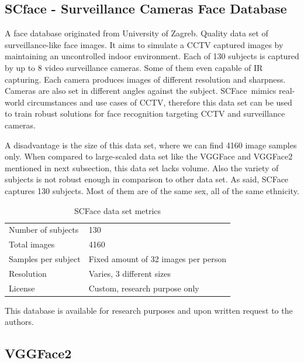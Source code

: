 \subsection{SCface - Surveillance Cameras Face Database}

A face database originated from University of Zagreb. Quality data set of surveillance-like face images. It aims to simulate a CCTV captured images by maintaining an uncontrolled indoor environment. Each of 130 subjects is captured by up to 8 video surveillance cameras. Some of them even capable of IR capturing. Each camera produces images of different resolution and sharpness. Cameras are also set in different angles against the subject. SCFace\,\cite{scface} mimics real-world circumstances and use cases of CCTV, therefore this data set can be used to train robust solutions for face recognition targeting CCTV and surveillance cameras.

A disadvantage is the size of this data set, where we can find \num{4160} image samples only. When compared to large-scaled data set like the VGGFace and VGGFace2 mentioned in next subsection, this data set lacks volume. Also the variety of subjects is not robust enough in comparison to other data set. As said, SCFace captures 130 subjects. Most of them are of the same sex, all of the same ethnicity.

\begin{table}[ht]
    \centering
    \caption{SCFace data set metrics}

    \begin{tabularx}{.8\textwidth}{l|X}
        \toprule
        Number of subjects & 130 \\
        Total images & \num{4160} \\
        Samples per subject & Fixed amount of 32 images per person \\
        Resolution & Varies, 3 different sizes \\
        License & Custom, research purpose only \\
        \bottomrule
    \end{tabularx}
\end{table}

This database is available for research purposes and upon written request to the authors.

\subsection{VGGFace2}

